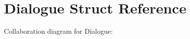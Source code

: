 \hypertarget{structDialogue}{}\section{Dialogue Struct Reference}
\label{structDialogue}


Collaboration diagram for Dialogue\+:
